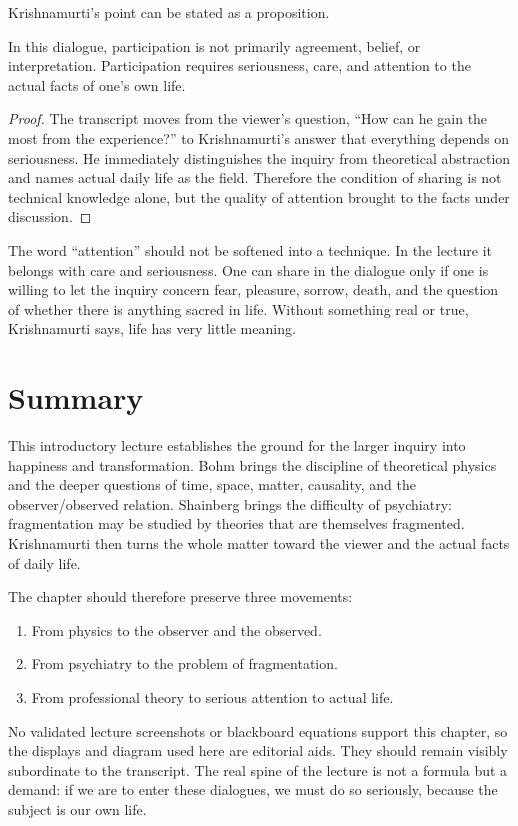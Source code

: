 Krishnamurti's point can be stated as a proposition.

\begin{proposition}
In this dialogue, participation is not primarily agreement, belief, or interpretation. Participation requires seriousness, care, and attention to the actual facts of one's own life.
\end{proposition}

\begin{proof}
The transcript moves from the viewer's question, ``How can he gain the most from the experience?'' to Krishnamurti's answer that everything depends on seriousness. He immediately distinguishes the inquiry from theoretical abstraction and names actual daily life as the field. Therefore the condition of sharing is not technical knowledge alone, but the quality of attention brought to the facts under discussion.
\end{proof}

The word ``attention'' should not be softened into a technique. In the lecture it belongs with care and seriousness. One can share in the dialogue only if one is willing to let the inquiry concern fear, pleasure, sorrow, death, and the question of whether there is anything sacred in life. Without something real or true, Krishnamurti says, life has very little meaning.

\section{Summary}

This introductory lecture establishes the ground for the larger inquiry into happiness and transformation. Bohm brings the discipline of theoretical physics and the deeper questions of time, space, matter, causality, and the observer/observed relation. Shainberg brings the difficulty of psychiatry: fragmentation may be studied by theories that are themselves fragmented. Krishnamurti then turns the whole matter toward the viewer and the actual facts of daily life.

The chapter should therefore preserve three movements:
\begin{enumerate}
\item From physics to the observer and the observed.
\item From psychiatry to the problem of fragmentation.
\item From professional theory to serious attention to actual life.
\end{enumerate}
No validated lecture screenshots or blackboard equations support this chapter, so the displays and diagram used here are editorial aids. They should remain visibly subordinate to the transcript. The real spine of the lecture is not a formula but a demand: if we are to enter these dialogues, we must do so seriously, because the subject is our own life.